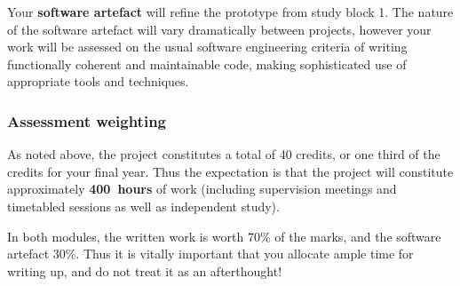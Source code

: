 Your \textbf{software artefact} will refine the prototype from study block 1.
The nature of the software artefact will vary dramatically between projects,
however your work will be assessed on the usual software engineering criteria of writing
functionally coherent and maintainable code, making sophisticated use of appropriate tools and techniques.

\subsubsection*{Assessment weighting}

As noted above, the project constitutes a total of 40 credits, or one third of the credits for your final year.
Thus the expectation is that the project will constitute approximately \textbf{400~hours} of work 
(including supervision meetings and timetabled sessions as well as independent study).

In both modules, the written work is worth 70\% of the marks, and the software artefact 30\%.
Thus it is vitally important that you allocate ample time for writing up, and do not treat it as an afterthought!
